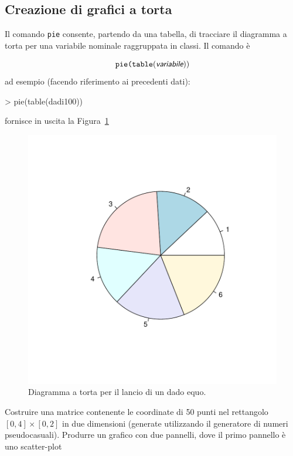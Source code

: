 \documentclass[onecolumn,11pt]{book}
\newcommand{\varia}[1]{\textsl{\textsf{#1}}}
\begin{document}
\subsection{Creazione di grafici a torta}

Il comando \texttt{pie} consente, partendo da una tabella, di tracciare il diagramma a torta per una variabile nominale raggruppata in classi. Il comando \`e

\begin{equation*}\texttt{pie(table}(\varia{variabile} ))
\end{equation*}
ad esempio (facendo riferimento ai precedenti dati):
\begin{Schunk}
\begin{Sinput}
> pie(table(dadi100))
\end{Sinput}
\end{Schunk}
fornisce in uscita  la Figura~\ref{fig:pie}
\begin{figure}[htbp]
\begin{center}
\includegraphics{statisticaconR-169}
\caption{Diagramma a torta per il lancio di un dado equo.}
\label{fig:pie}
\end{center}
\end{figure}
\begin{shaded}{Costruire una matrice contenente le coordinate di 50 punti nel rettangolo $[0,4]\times [0,2]$ in due dimensioni (generate utilizzando il generatore di numeri pseudocasuali). Produrre un grafico con due pannelli, dove il primo pannello \`e uno scatter-plot}
\end{shaded}
\end{document}
